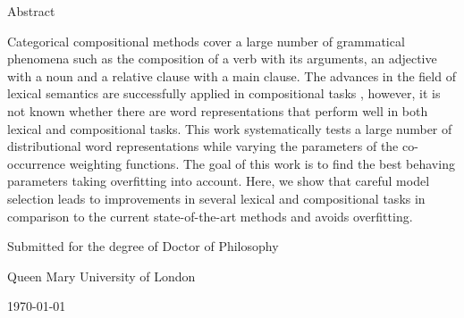 {\Large \headingfont \thetitle}

\vspace{1em}

{\large \headingfont \theauthor}

\vspace{1em}

{\headingfont Abstract}

Categorical compositional methods \cite{DBLP:journals/corr/abs-1003-4394} cover a large number of grammatical phenomena such as the composition of a verb with its arguments, an adjective with a noun and a relative clause with a main clause. The advances in the field of lexical semantics \cite{mikolov2013efficient,baroni-dinu-kruszewski:2014:P14-1,TACL570} are successfully applied in compositional tasks \cite{milajevs-EtAl:2014:EMNLP2014}, however, it is not known whether there are word representations that perform well in both lexical and compositional tasks.
%
This work systematically tests a large number of distributional word representations while varying the parameters of the co-occurrence weighting functions.
The goal of this work is to find the best behaving parameters taking overfitting \cite{lapesa2014large} into account.
%
Here, we show that careful model selection leads to improvements in several lexical and compositional tasks in comparison to the current state-of-the-art methods and avoids overfitting.

\vfill


Submitted for the degree of Doctor of Philosophy

Queen Mary University of London

\today


